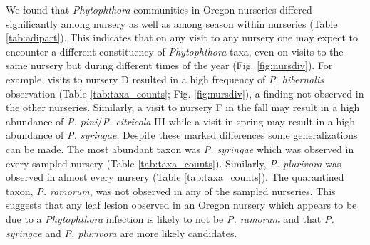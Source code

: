 \documentclass[12pt]{article}
\begin{document}
We found that \emph{Phytophthora} communities in Oregon nurseries differed significantly among nursery as well as among season within nurseries (Table \ref{tab:adipart}).  This indicates that on any visit to any nursery one may expect to encounter a different constituency of \emph{Phytophthora} taxa, even on visits to the same nursery but during different times of the year (Fig. \ref{fig:nursdiv}).  For example, visits to nursery D resulted in a high frequency of \emph{P. hibernalis} observation (Table \ref{tab:taxa_counts}; Fig. \ref{fig:nursdiv}), a finding not observed in the other nurseries.  Similarly, a visit to nursery F in the fall may result in a high abundance of \emph{P. pini}/\emph{P. citricola} III while a visit in spring may result in a high abundance of \emph{P. syringae}.  Despite these marked differences some generalizations can be made.  The most abundant taxon was \emph{P. syringae} which was observed in every sampled nursery (Table \ref{tab:taxa_counts}).  Similarly, \emph{P. plurivora} was observed in almost every nursery (Table \ref{tab:taxa_counts}).  The quarantined taxon, \emph{P. ramorum}, was not observed in any of the sampled nurseries.  This suggests that any leaf lesion observed in an Oregon nursery which appears to be due to a \emph{Phytophthora} infection is likely to not be \emph{P. ramorum} and that \emph{P. syringae} and \emph{P. plurivora} are more likely candidates.
\end{document}
